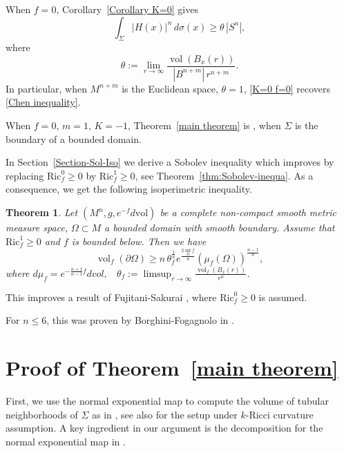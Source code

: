 \documentclass[psamsfonts]{amsart}
\newtheorem{thm}{Theorem}[section]
\theoremstyle{definition}
\theoremstyle{remark}
\newcommand{\vol}{\mbox{vol}}
\def \lims {\lim\limits}
\numberwithin{equation}{section}
\begin{document}
When $f=0$, Corollary~\ref{Corollary K=0} gives \begin{equation}
\int_\Sigma   |H(x)|^n\,d\sigma(x) 
 \ge \theta \, |S^n|,   \label{K=0 f=0}
\end{equation}
where 
\begin{equation}
    \theta := \lims_{r \to \infty}\frac{\operatorname{vol}(B_x(r))}{|B^{n+m}| \,  r^{n+m}}.  \label{theta}
\end{equation} 
In particular, when $M^{n+m}$ is the Euclidean space, $\theta =1$, \eqref{K=0 f=0} recovers \eqref{Chen inequality}.

When $f=0$, $m=1$, $K=-1$,  Theorem~\ref{main theorem} is  \cite[(1.5)]{jin-yin}, when $\Sigma$ is the boundary of a bounded domain.  
 

In Section~\ref{Section-Sol-Iso} we derive a Sobolev inequality  which improves \cite[Theorem 5.1]{Fujitani26} by replacing $\mathrm{Ric}_f^0 \geq 0$ by
$\mathrm{Ric}_f^1 \geq 0$, see Theorem~\ref{thm:Sobolev-inequa}. As a consequence, we get the following isoperimetric inequality. 
\begin{thm} \label{Iso inequa thm}
    Let $(M^n,g,e^{-f} d\vol)$ be a complete non-compact smooth metric measure space, $\Omega \subset M$ a bounded domain with smooth boundary.
    Assume that $\mathrm{Ric}_f^1 \geq 0$ and $f$ is bounded below. Then we have
    $$\operatorname{vol}_f(\partial \Omega) \geq n \,\theta_f^\frac{1}{n} e^{\frac{2 \inf_M f}{n}} (\mu_f(\Omega))^\frac{n-1}{n},$$
    where $d \mu_f = e^{-\frac{n+1}{n-1}f}dvol,$ \  $\theta_f := \limsup_{r \to \infty}\frac{\operatorname{vol}_f(B_x(r))}{r^n}$.
\end{thm}
This improves a result of Fujitani-Sakurai \cite{Fujitani26}, where $\mathrm{Ric}_f^0 \geq 0$ is assumed.

For $n\le 6$, this was proven by  Borghini-Fogagnolo in \cite{borghini2023comparison}.

    \section{Proof of Theorem~\ref{main theorem}}
    First, we use the normal exponential map to compute the volume of tubular neighborhoods of $\Sigma$ as in \cite{Heintze-Karcher}, see also \cite{Chahine} for the setup under $k$-Ricci curvature assumption. A key ingredient in our argument is the decomposition for the normal exponential map in \cite{Pan-Yi2026}. 

\end{document}
